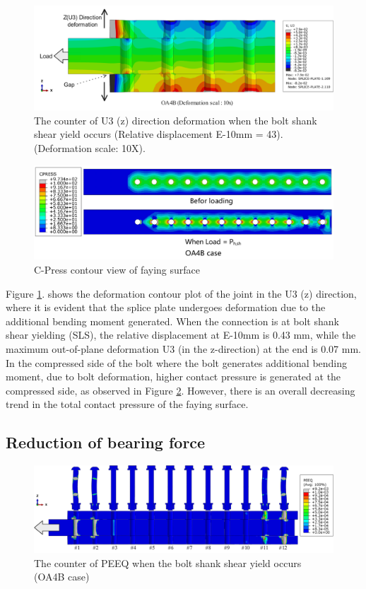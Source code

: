 \begin{figure}
    \centering
    \includegraphics[width=0.85\linewidth]{imgs/ch7/OP-def-ana.pdf}
    \caption{The counter of U3 (z) direction deformation when the bolt shank shear yield occurs (Relative displacement E-10mm = 43). (Deformation scale: 10X).}
    \label{fig-OP-def-ana}
\end{figure}


\begin{figure}
    \centering
    \includegraphics[width=0.8\linewidth]{imgs/ch7/OA4B-cpress.pdf}
    \caption{C-Press contour view of faying surface}
    \label{fig-cpress}
\end{figure}

Figure \ref{fig-OP-def-ana}. shows the deformation contour plot of the joint in the U3 (z) direction, where it is evident that the splice plate undergoes deformation due to the additional bending moment generated. When the connection is at bolt shank shear yielding (SLS), the relative displacement at E-10mm is 0.43 mm, while the maximum out-of-plane deformation U3 (in the z-direction) at the end is 0.07 mm.
In the compressed side of the bolt where the bolt generates additional bending moment, due to bolt deformation, higher contact pressure is generated at the compressed side, as observed in Figure \ref{fig-cpress}. However, there is an overall decreasing trend in the total contact pressure of the faying surface.



\subsection{Reduction of bearing force} \label{sec-rduc-bea}


\begin{figure}
    \centering
    \includegraphics[width=0.9\linewidth]{imgs/ch7/beadist.pdf}
    \caption{The counter of PEEQ when the bolt shank shear yield occurs (OA4B case)}
    \label{fig-bsh}
\end{figure}


